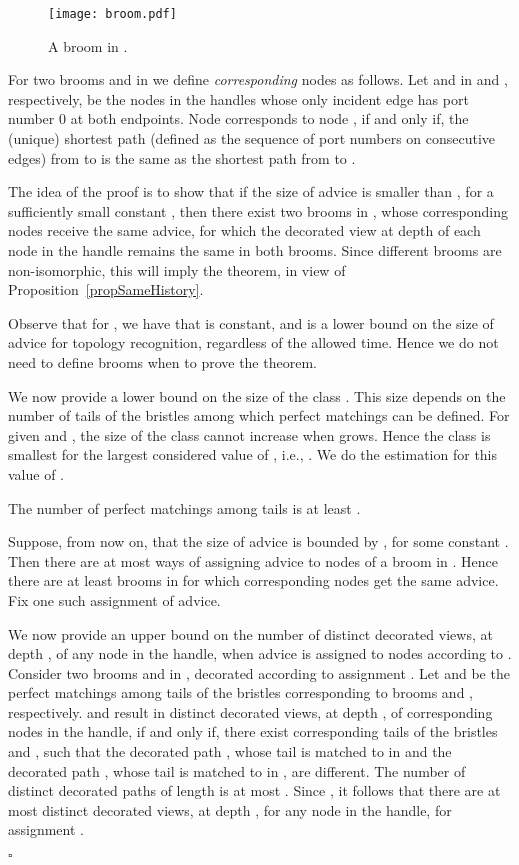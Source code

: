 \documentclass{article}
\newcommand*{\qed}{\hfill\ensuremath{\square}}
\newenvironment{proof}{\noindent{\bf Proof:}}{\qed}
\begin{document}
\begin{proof}
\begin{figure}
\centering
\texttt{[image: broom.pdf]}
\caption{\label{fig.fan} A broom in .}
\end{figure}

For two brooms  and  in  we define {\em corresponding} nodes as follows. Let  and  in  and , respectively, be the nodes in the handles whose only incident edge has port number 0 at both endpoints.
Node {} corresponds to node {}, if and only if, the (unique) shortest path (defined as the sequence of  port numbers on consecutive edges) from  to  is the same as the shortest path from  to .

The idea of the proof is to show that if the size of advice is smaller than , for a sufficiently small constant , then there exist two brooms in , whose corresponding nodes receive the same advice, for which the decorated view at depth  of each node in the handle remains the same in both brooms. 
Since different brooms are non-isomorphic, this will imply the theorem, in view of Proposition~\ref{propSameHistory}.

Observe that for , we have that  is constant, and   is a lower bound on the size of advice for topology recognition, regardless of the allowed time.
Hence we do not need to define brooms when  to prove the theorem.


We now provide a lower bound on the size of the class . 
This size depends on the number  of tails of the bristles among which perfect matchings  can be defined.
For given  and , the size of the class  cannot increase when  grows. 
Hence the class is smallest for the largest considered value of , i.e., .
We do the estimation for this value of .

The number of perfect matchings among tails is at least .




Suppose, from now on, that the size of advice is bounded by , for some constant .
Then there are at most  ways of assigning advice to nodes of a broom in . 
Hence there are at least  brooms in  for which corresponding nodes get the same advice. Fix one such assignment  of advice.


We now provide an upper bound on the number of distinct decorated views, at depth , of any node in the handle, when advice is assigned to nodes according to .
Consider two brooms  and  in , decorated according to assignment .
Let  and  be the perfect matchings among tails of the bristles corresponding to brooms  and , respectively.
 and  result in distinct decorated views, at depth , of corresponding nodes in the handle, if and only if, there exist corresponding tails of the bristles  and , such that the decorated path , whose tail   is matched to  in  and the decorated path , whose tail   is  matched to  in , are different.
The number of distinct decorated paths  of length  is at most .
Since , it follows that there are at most  distinct decorated views, at depth , for any node in the handle, for assignment .


\end{proof}
\end{document}
